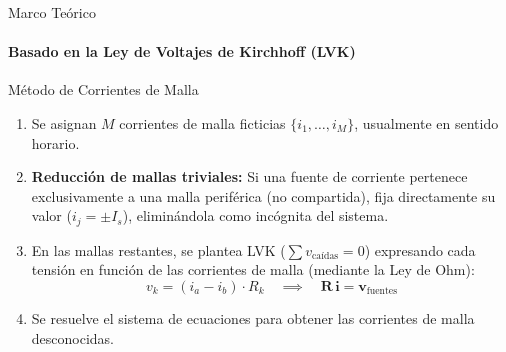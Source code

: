 \documentclass[10pt, aspectratio=169, handout]{beamer}
\begin{document}

\begin{frame}{Marco Teórico}
    \framesubtitle{Basado en la \textbf{Ley de Voltajes de Kirchhoff (LVK)}}
    \begin{boxTeoria}{Método de Corrientes de Malla}
        \begin{enumerate}
            \item Se asignan $M$ corrientes de malla ficticias $\{i_1, \dots, i_M\}$, usualmente en sentido horario.
            \item \textbf{Reducción de mallas triviales:} Si una fuente de corriente pertenece exclusivamente a una malla periférica (no compartida), fija directamente su valor ($i_j = \pm I_s$), eliminándola como incógnita del sistema.
            \item En las mallas restantes, se plantea LVK ($\sum v_{\text{caídas}} = 0$) expresando cada tensión en función de las corrientes de malla (mediante la Ley de Ohm):
                  \begin{equation*}
                      v_k = (i_a - i_b) \cdot R_k \quad \implies \quad \mathbf{R}\,\mathbf{i} = \mathbf{v}_{\text{fuentes}}
                  \end{equation*}
            \item Se resuelve el sistema de ecuaciones para obtener las corrientes de malla desconocidas.
        \end{enumerate}
    \end{boxTeoria}
\end{frame}
\end{document}
